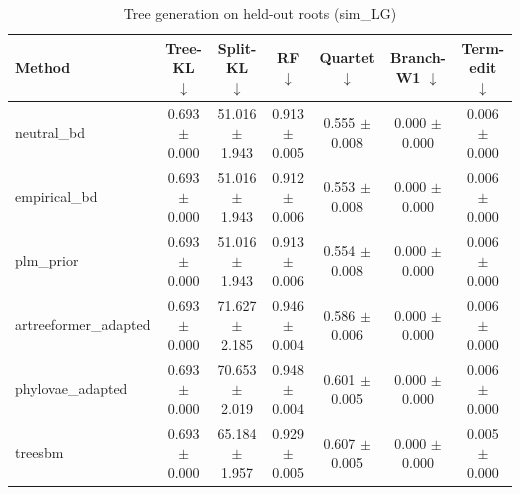 \begin{table}[t]\centering
\caption{Tree generation on held-out roots (sim_LG)}
\begin{tabular}{lcccccc}
\toprule
Method & Tree-KL $\downarrow$ & Split-KL $\downarrow$ & RF $\downarrow$ & Quartet $\downarrow$ & Branch-W1 $\downarrow$ & Term-edit $\downarrow$ \\
\midrule
neutral\_bd & 0.693 $\pm$ 0.000 & 51.016 $\pm$ 1.943 & 0.913 $\pm$ 0.005 & 0.555 $\pm$ 0.008 & 0.000 $\pm$ 0.000 & 0.006 $\pm$ 0.000 \\
empirical\_bd & 0.693 $\pm$ 0.000 & 51.016 $\pm$ 1.943 & 0.912 $\pm$ 0.006 & 0.553 $\pm$ 0.008 & 0.000 $\pm$ 0.000 & 0.006 $\pm$ 0.000 \\
plm\_prior & 0.693 $\pm$ 0.000 & 51.016 $\pm$ 1.943 & 0.913 $\pm$ 0.006 & 0.554 $\pm$ 0.008 & 0.000 $\pm$ 0.000 & 0.006 $\pm$ 0.000 \\
artreeformer\_adapted & 0.693 $\pm$ 0.000 & 71.627 $\pm$ 2.185 & 0.946 $\pm$ 0.004 & 0.586 $\pm$ 0.006 & 0.000 $\pm$ 0.000 & 0.006 $\pm$ 0.000 \\
phylovae\_adapted & 0.693 $\pm$ 0.000 & 70.653 $\pm$ 2.019 & 0.948 $\pm$ 0.004 & 0.601 $\pm$ 0.005 & 0.000 $\pm$ 0.000 & 0.006 $\pm$ 0.000 \\
treesbm & 0.693 $\pm$ 0.000 & 65.184 $\pm$ 1.957 & 0.929 $\pm$ 0.005 & 0.607 $\pm$ 0.005 & 0.000 $\pm$ 0.000 & 0.005 $\pm$ 0.000 \\
\bottomrule
\end{tabular}
\end{table}